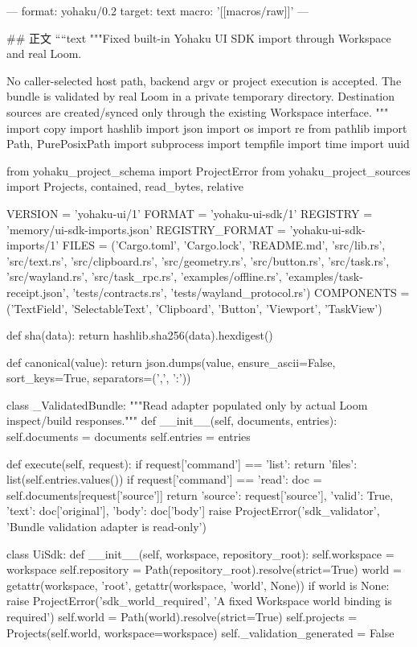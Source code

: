 ---
format: yohaku/0.2
target: text
macro: '[[macros/raw]]'
---

## 正文
````text
"""Fixed built-in Yohaku UI SDK import through Workspace and real Loom.

No caller-selected host path, backend argv or project execution is accepted. The
bundle is validated by real Loom in a private temporary directory. Destination
sources are created/synced only through the existing Workspace interface.
"""
import copy
import hashlib
import json
import os
import re
from pathlib import Path, PurePosixPath
import subprocess
import tempfile
import time
import uuid

from yohaku_project_schema import ProjectError
from yohaku_project_sources import Projects, contained, read_bytes, relative

VERSION = 'yohaku-ui/1'
FORMAT = 'yohaku-ui-sdk/1'
REGISTRY = 'memory/ui-sdk-imports.json'
REGISTRY_FORMAT = 'yohaku-ui-sdk-imports/1'
FILES = ('Cargo.toml', 'Cargo.lock', 'README.md', 'src/lib.rs', 'src/text.rs',
         'src/clipboard.rs', 'src/geometry.rs', 'src/button.rs', 'src/task.rs',
         'src/wayland.rs', 'src/task_rpc.rs', 'examples/offline.rs', 'examples/task-receipt.json',
         'tests/contracts.rs', 'tests/wayland_protocol.rs')
COMPONENTS = ('TextField', 'SelectableText', 'Clipboard', 'Button', 'Viewport', 'TaskView')


def sha(data):
    return hashlib.sha256(data).hexdigest()


def canonical(value):
    return json.dumps(value, ensure_ascii=False, sort_keys=True, separators=(',', ':'))


class _ValidatedBundle:
    """Read adapter populated only by actual Loom inspect/build responses."""
    def __init__(self, documents, entries):
        self.documents = documents
        self.entries = entries

    def execute(self, request):
        if request['command'] == 'list':
            return {'files': list(self.entries.values())}
        if request['command'] == 'read':
            doc = self.documents[request['source']]
            return {'source': request['source'], 'valid': True,
                    'text': doc['original'], 'body': doc['body']}
        raise ProjectError('sdk_validator', 'Bundle validation adapter is read-only')


class UiSdk:
    def __init__(self, workspace, repository_root):
        self.workspace = workspace
        self.repository = Path(repository_root).resolve(strict=True)
        world = getattr(workspace, 'root', getattr(workspace, 'world', None))
        if world is None:
            raise ProjectError('sdk_world_required', 'A fixed Workspace world binding is required')
        self.world = Path(world).resolve(strict=True)
        self.projects = Projects(self.world, workspace=workspace)
        self._validation_generated = False

